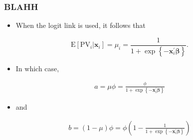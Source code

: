 \documentclass[t]{beamer}
\newcommand{\matr}[1]{\mathbf{#1}}
\begin{document}
\begin{frame}
	\frametitle{BLAHH}
	\begin{itemize}
		\item When the logit link is used, it follows that
	\end{itemize}
$$\text{E}[\text{PV}_i|\matr{x}_i] = \mu_i = \frac{1}{1 + \exp\left\{-\matr{x}_i^{\prime}\bm{\beta} \right\}}.$$
\begin{itemize}
\item[] In which case,  %
\end{itemize}
\vspace{-.15in}
\begin{eqnarray*}
a = \mu\phi 
	= \frac{\phi}{1 + \exp\left\{-\matr{x}_i^{\prime}\bm{\beta}\right\}}
\end{eqnarray*}
\vspace{-.2in}
\begin{itemize}
\item[] and
\end{itemize}
\vspace{-.15in}
	\begin{eqnarray*}
	b = (1 - \mu)\phi 
		= \phi\left(1 - \frac{1}{1 + \exp\left\{-\matr{x}_i^{\prime}\bm{\beta}\right\}} \right)
	\end{eqnarray*}
\end{frame}


 
\end{document}
